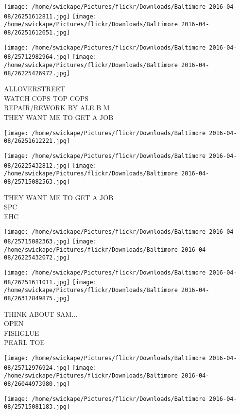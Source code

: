 \documentclass[10pt,letterpaper]{article}
\begin{document}
\texttt{[image: /home/swickape/Pictures/flickr/Downloads/Baltimore 2016-04-08/26251612811.jpg]}
\texttt{[image: /home/swickape/Pictures/flickr/Downloads/Baltimore 2016-04-08/26251612651.jpg]}

\texttt{[image: /home/swickape/Pictures/flickr/Downloads/Baltimore 2016-04-08/25712982964.jpg]}
\texttt{[image: /home/swickape/Pictures/flickr/Downloads/Baltimore 2016-04-08/26225426972.jpg]}

ALLOVERSTREET\\
WATCH COPS TOP COPS\\
REPAIR/REWORK BY ALE B M\\
THEY WANT ME TO GET A JOB
\pagebreak

\texttt{[image: /home/swickape/Pictures/flickr/Downloads/Baltimore 2016-04-08/26251612221.jpg]}

\vspace{0.25in}
\texttt{[image: /home/swickape/Pictures/flickr/Downloads/Baltimore 2016-04-08/26225432812.jpg]}
\texttt{[image: /home/swickape/Pictures/flickr/Downloads/Baltimore 2016-04-08/25715082563.jpg]}

THEY WANT ME TO GET A JOB\\
SPC\\
EHC
\pagebreak

\texttt{[image: /home/swickape/Pictures/flickr/Downloads/Baltimore 2016-04-08/25715082363.jpg]}
\texttt{[image: /home/swickape/Pictures/flickr/Downloads/Baltimore 2016-04-08/26225432072.jpg]}

\texttt{[image: /home/swickape/Pictures/flickr/Downloads/Baltimore 2016-04-08/26251611011.jpg]}
\texttt{[image: /home/swickape/Pictures/flickr/Downloads/Baltimore 2016-04-08/26317849875.jpg]}

THINK ABOUT SAM...\\
OPEN\\
FISHGLUE\\
PEARL TOE
\pagebreak

\texttt{[image: /home/swickape/Pictures/flickr/Downloads/Baltimore 2016-04-08/25712976924.jpg]}
\texttt{[image: /home/swickape/Pictures/flickr/Downloads/Baltimore 2016-04-08/26044973980.jpg]}

\vspace{0.25in}
\texttt{[image: /home/swickape/Pictures/flickr/Downloads/Baltimore 2016-04-08/25715081183.jpg]}
\end{document}
